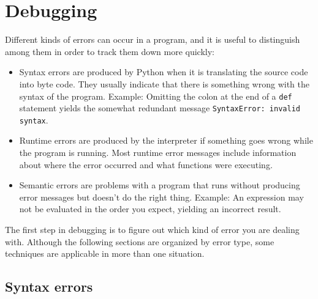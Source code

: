 \documentclass[10pt]{book}
\begin{document}

% 

\appendix

\chapter{Debugging}

Different kinds of errors can occur
in a program, and it is useful to distinguish among them
in order to track them down more quickly:

\begin{itemize}

\item Syntax errors are produced by Python when it is translating the
  source code into byte code.  They usually indicate that there is
  something wrong with the syntax of the program.  Example: Omitting
  the colon at the end of a {\tt def} statement yields the somewhat
  redundant message {\tt SyntaxError: invalid syntax}.

\item Runtime errors are produced by the interpreter if something goes
  wrong while the program is running.  Most runtime error messages
  include information about where the error occurred and what
  functions were executing.  

\item Semantic errors are problems with a program that runs without
  producing error messages but doesn't do the right thing.  Example:
  An expression may not be evaluated in the order you expect, yielding
  an incorrect result.

\end{itemize}


The first step in debugging is to figure out which kind of
error you are dealing with.  Although the following sections are
organized by error type, some techniques are
applicable in more than one situation.


\section{Syntax errors}
\end{document}

